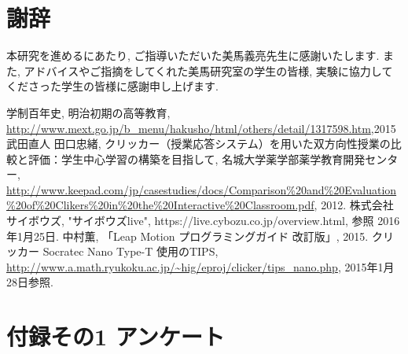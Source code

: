 \documentclass{funthesis}
\begin{document}
\chapter*{謝辞}
本研究を進めるにあたり, ご指導いただいた美馬義亮先生に感謝いたします. また, アドバイスやご指摘をしてくれた美馬研究室の学生の皆様, 実験に協力してくださった学生の皆様に感謝申し上げます. 


\begin{thebibliography}{9}
  学制百年史, 明治初期の高等教育, \url{http://www.mext.go.jp/b_menu/hakusho/html/others/detail/1317598.htm},2015
    武田直人 田口忠緒,  クリッカー（授業応答システム）を用いた双方向性授業の比較と評価：学生中心学習の構築を目指して, 名城大学薬学部薬学教育開発センター, \url{http://www.keepad.com/jp/casestudies/docs/Comparison%20and%20Evaluation%20of%20Clikers%20in%20the%20Interactive%20Classroom.pdf}, 2012.
  株式会社サイボウズ, "サイボウズlive", https://live.cybozu.co.jp/overview.html, 参照 2016年1月25日.
   中村薫, 「Leap Motion プログラミングガイド 改訂版」, 2015.
   クリッカー Socratec Nano Type-T 使用のTIPS, \url{http://www.a.math.ryukoku.ac.jp/~hig/eproj/clicker/tips_nano.php}, 2015年1月28日参照.
\end{thebibliography}





\appendix

\chapter*{付録その1 アンケート} %
\end{document}
